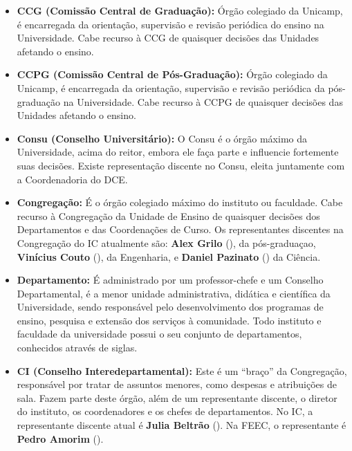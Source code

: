 \begin{itemize}
    \item  \textbf{CCG (Comissão Central de Graduação):} Órgão colegiado da
    Unicamp, é encarregada da orientação, supervisão e revisão periódica do
    ensino na Universidade. Cabe recurso à CCG de quaisquer decisões das
    Unidades afetando o ensino.

    \item  \textbf{CCPG (Comissão Central de Pós-Graduação):} Órgão colegiado da
    Unicamp, é encarregada da orientação, supervisão e revisão periódica da
    pós-graduação na Universidade. Cabe recurso à CCPG de quaisquer decisões das
    Unidades afetando o ensino.

    \item  \textbf{Consu (Conselho Universitário):} O Consu é o órgão máximo da
    Universidade, acima do reitor, embora ele faça parte e influencie
    fortemente suas decisões.  Existe representação discente no Consu, eleita
    juntamente com a Coordenadoria do DCE.

    \item  \textbf{Congregação:} É o órgão colegiado máximo do instituto ou faculdade.
    Cabe recurso à Congregação da Unidade de Ensino de quaisquer decisões dos
    Departamentos e das Coordenações de Curso. Os representantes discentes na
    Congregação do IC atualmente são: \textbf{Alex Grilo} (), da
    pós-graduaçao, \textbf{Vinícius Couto} (), da Engenharia,
    e \textbf{Daniel Pazinato} () da Ciência.

    \item  \textbf{Departamento:} É administrado por um professor-chefe e um
    Conselho Departamental, é a menor unidade administrativa, didática
    e científica da Universidade, sendo responsável pelo desenvolvimento dos
    programas de ensino, pesquisa e extensão dos serviços à comunidade. Todo
    instituto e faculdade da universidade possui o seu conjunto de
    departamentos, conhecidos através de siglas.

    \item  \textbf{CI (Conselho Interedepartamental):} Este é um ``braço'' da
    Congregação, responsável por tratar de assuntos menores, como despesas
    e atribuições de sala. Fazem parte deste órgão, além de um representante
    discente, o diretor do instituto, os coordenadores e os chefes de
    departamentos. No IC, a representante discente atual é \textbf{Julia Beltrão}
    (). Na FEEC, o representante é
    \textbf{Pedro Amorim} ().


\end{itemize}

